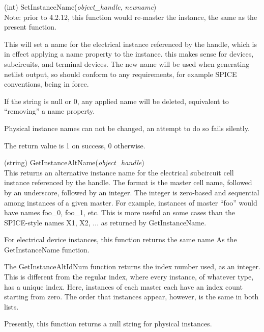 \begin{description}
\item{(int) \vt SetInstanceName({\it object\_handle\/}, {\it newname\/})}\\
Note:  prior to 4.2.12, this function would re-master the instance,
the same as the present  function.

This will set a name for the electrical instance referenced by the
handle, which is in effect applying a name property to the instance. 
this makes sense for devices, subcircuits, and terminal devices.  The
new name will be used when generating netlist output, so should
conform to any requirements, for example SPICE conventions, being in
force.

If the string is null or 0, any applied name will be deleted,
equivalent to ``removing'' a name property.

Physical instance names can not be changed, an attempt to do so fails
silently.

The return value is 1 on success, 0 otherwise.

\item{(string) \vt GetInstanceAltName({\it object\_handle\/})}\\
This returns an alternative instance name for the electrical
subcircuit cell instance referenced by the handle.  The format is the
master cell name, followed by an underscore, followed by an integer. 
The integer is zero-based and sequential among instances of a given
master.  For example, instances of master ``{\vt foo}'' would have
names {\vt foo\_0}, {\vt foo\_1}, etc.  This is more useful an some
cases than the SPICE-style names {\vt X1}, {\vt X2}, ...  as returned
by {\vt GetInstanceName}.

For electrical device instances, this function returns the same
name As the {\vt GetInstanceName} function.

The {\vt GetInstanceAltIdNum} function returns the index number used,
as an integer.  This is different from the regular index, where every
instance, of whatever type, has a unique index.  Here, instances of
each master each have an index count starting from zero.  The order
that instances appear, however, is the same in both lists. 

Presently, this function returns a null string for physical instances.


\end{description}
